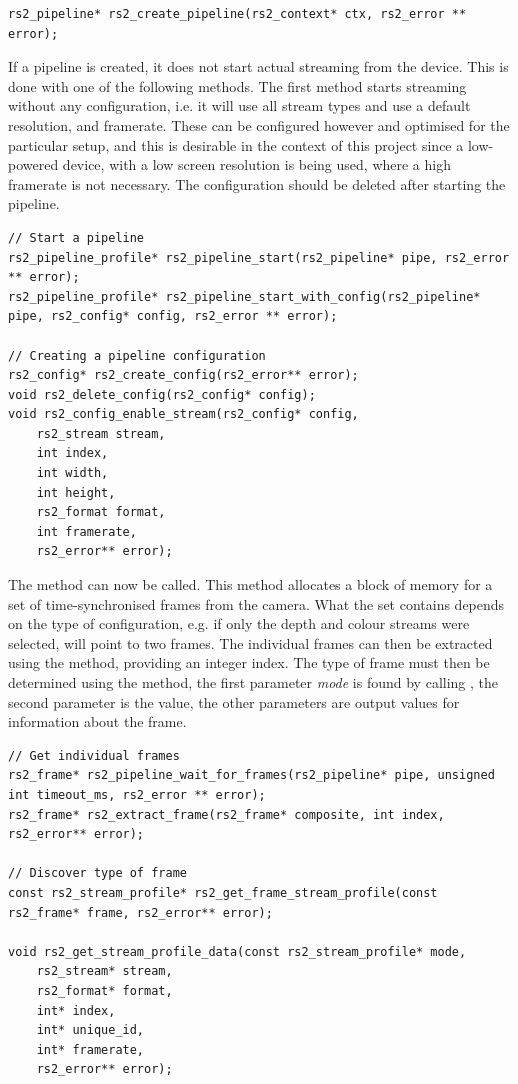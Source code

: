     \begin{lstlisting}[style=CStyle]
rs2_pipeline* rs2_create_pipeline(rs2_context* ctx, rs2_error ** error);\end{lstlisting}   

    If a pipeline is created, it does not start actual streaming from the device. This is done with one of the following methods. The first method starts streaming without any configuration, i.e. it will use all stream types and use a default resolution, and framerate. These can be configured however and optimised for the particular setup, and this is desirable in the context of this project since a low-powered device, with a low screen resolution is being used, where a high framerate is not necessary. The configuration should be deleted after starting the pipeline.

    \begin{lstlisting}[style=CStyle]
// Start a pipeline
rs2_pipeline_profile* rs2_pipeline_start(rs2_pipeline* pipe, rs2_error ** error);
rs2_pipeline_profile* rs2_pipeline_start_with_config(rs2_pipeline* pipe, rs2_config* config, rs2_error ** error);

// Creating a pipeline configuration
rs2_config* rs2_create_config(rs2_error** error);
void rs2_delete_config(rs2_config* config);
void rs2_config_enable_stream(rs2_config* config,
    rs2_stream stream,
    int index,
    int width,
    int height,
    rs2_format format,
    int framerate,
    rs2_error** error);\end{lstlisting}

    The  method can now be called. This method allocates a block of memory for a set of time-synchronised frames from the camera. What the set contains depends on the type of configuration, e.g. if only the depth and colour streams were selected,  will point to two frames. The individual frames can then be extracted using the  method, providing an integer index. The type of frame must then be determined using the  method, the first parameter {\slshape mode} is found by calling , the second parameter is the  value, the other parameters are output values for information about the frame.

    \begin{lstlisting}[style=CStyle]
// Get individual frames
rs2_frame* rs2_pipeline_wait_for_frames(rs2_pipeline* pipe, unsigned int timeout_ms, rs2_error ** error);
rs2_frame* rs2_extract_frame(rs2_frame* composite, int index, rs2_error** error);

// Discover type of frame
const rs2_stream_profile* rs2_get_frame_stream_profile(const rs2_frame* frame, rs2_error** error);

void rs2_get_stream_profile_data(const rs2_stream_profile* mode, 
    rs2_stream* stream, 
    rs2_format* format, 
    int* index, 
    int* unique_id, 
    int* framerate, 
    rs2_error** error);\end{lstlisting}

